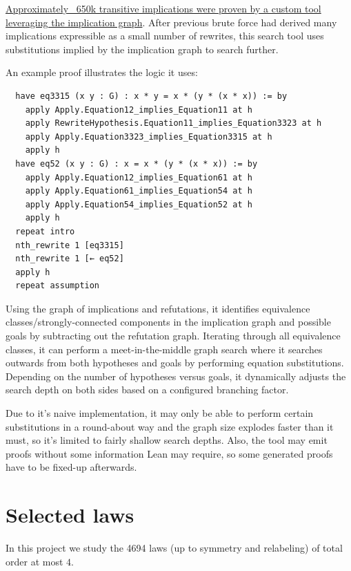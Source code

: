 \href{https://github.com/teorth/equational_theories/tree/main/equational_theories/Generated/EquationSearch}{Approximately ~650k transitive implications were proven by a custom tool leveraging the implication graph}. After previous brute force had derived many implications expressible as a small number of rewrites, this search tool uses substitutions implied by the implication graph to search further.

An example proof illustrates the logic it uses:

\begin{verbatim}
  have eq3315 (x y : G) : x * y = x * (y * (x * x)) := by
    apply Apply.Equation12_implies_Equation11 at h
    apply RewriteHypothesis.Equation11_implies_Equation3323 at h
    apply Apply.Equation3323_implies_Equation3315 at h
    apply h
  have eq52 (x y : G) : x = x * (y * (x * x)) := by
    apply Apply.Equation12_implies_Equation61 at h
    apply Apply.Equation61_implies_Equation54 at h
    apply Apply.Equation54_implies_Equation52 at h
    apply h
  repeat intro
  nth_rewrite 1 [eq3315]
  nth_rewrite 1 [← eq52]
  apply h
  repeat assumption
\end{verbatim}

Using the graph of implications and refutations, it identifies equivalence classes/strongly-connected components in the implication graph and possible goals by subtracting out the refutation graph. Iterating through all equivalence classes, it can perform a meet-in-the-middle graph search where it searches outwards from both hypotheses and goals by performing equation substitutions. Depending on the number of hypotheses versus goals, it dynamically adjusts the search depth on both sides based on a configured branching factor.

Due to it's naive implementation, it may only be able to perform certain substitutions in a round-about way and the graph size explodes faster than it must, so it's limited to fairly shallow search depths. Also, the tool may emit proofs without some information Lean may require, so some generated proofs have to be fixed-up afterwards.


\chapter{Selected laws}\label{subgraph-eq}

In this project we study the 4694 laws (up to symmetry and relabeling) of total order at most $4$.

